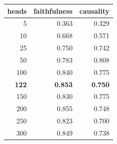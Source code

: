\begin{tabular}{r r r}
\toprule
heads & faithfulness & causality \\
\midrule
5 & 0.363 & 0.329 \\
10 & 0.668 & 0.571 \\
25 & 0.750 & 0.742 \\
50 & 0.783 & 0.808 \\
100 & 0.840 & 0.775 \\
\textbf{122} & \textbf{0.853} & \textbf{0.750} \\
150 & 0.830 & 0.775 \\
200 & 0.855 & 0.748 \\
250 & 0.823 & 0.700 \\
300 & 0.849 & 0.738 \\
\bottomrule
\end{tabular}
